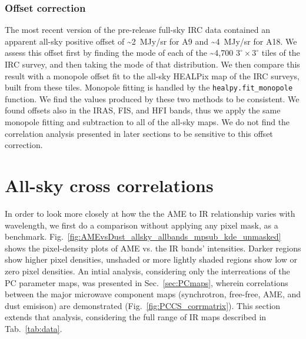     \subsubsection{Offset correction}
      The most recent version of the pre-release full-sky IRC data contained an apparent all-sky positive offset of \textasciitilde{}2~MJy/sr for A9 and \textasciitilde{}4~MJy/sr for A18. We assess this offset first by finding the mode of each of the \textasciitilde{}4,700 $3^{\circ}\times3^{\circ}$ tiles of the IRC survey, and then taking the mode of that distribution. We then compare this result with a monopole offset fit to the all-sky HEALPix map of the IRC surveys, built from these tiles. Monopole fitting is handled by the {\tt healpy.fit\_monopole} function. We find the values produced by these two methods to be consistent. We found offsets also in the IRAS, FIS, and HFI bands, thus we apply the same monopole fitting and subtraction to all of the all-sky maps. We do not find the correlation analysis presented in later sections to be sensitive to this offset correction.

  \section{All-sky cross correlations}
        In order to look more closely at how the the AME to IR relationship varies with wavelength, we first do a comparison without applying any pixel mask, as a benchmark. Fig.~\ref{fig:AMEvsDust_allsky_allbands_mpsub_kde_unmasked} shows the pixel-density plots of AME vs. the IR bands' intensities. Darker regions show higher pixel densities, unshaded or more lightly shaded regions show low or zero pixel densities. An intial analysis, considering only the interreations of the PC parameter maps, was presented in Sec.~\ref{sec:PCmaps}, wherein correlations between the major microwave component maps (synchrotron, free-free, AME, and dust emisison) are demonstrated (Fig.~\ref{fig:PCCS_corrmatrix}). This section extends that analysis, considering the full range of IR maps described in Tab.~\ref{tab:data}.


